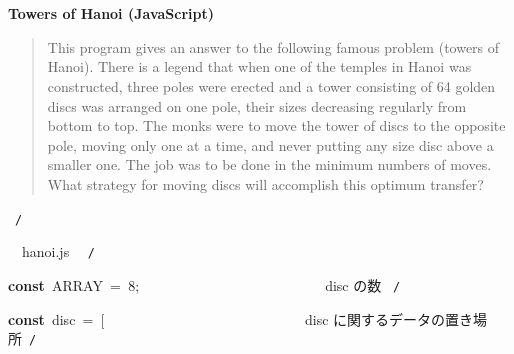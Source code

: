 \documentclass[a4paper,10pt]{article}
\def\mc{\relax}
\begin{document}
\tt\mc 

\noindent
\mbox{}\rm\mc {\tt /}{\tt *}\  \hrulefill *
\tt\mc 

\noindent
\mbox{}\hfill

\noindent
\mbox{}\rm\mc \ %

\centerline{\bf Towers of Hanoi (JavaScript)}

\begin{quote}

This program gives an answer to the following famous problem (towers of
Hanoi).
There is a legend that when one of the temples in Hanoi was constructed,
three poles were erected and a tower consisting of 64 golden discs was
arranged on one pole, their sizes decreasing regularly from bottom to top.
The monks were to move the tower of discs to the opposite pole, moving
only one at a time, and never putting any size disc above a smaller one.
The job was to be done in the minimum numbers of moves. What strategy for
moving discs will accomplish this optimum transfer?
\end{quote}

\tt\mc 

\noindent
\mbox{}\hfill

\noindent
\mbox{}\rm\mc {\tt *} \hrulefill \rm\mc \ {\tt *}{\tt /}
\tt\mc 

\noindent
\mbox{}\hfill

\noindent
\mbox{}\rm\mc {\tt /}{\tt *}\  \hrulefill\ hanoi.js \ \hrulefill \rm\mc \ {\tt *}{\tt /}
\tt\mc 

\noindent
\mbox{}\hfill

\noindent
\mbox{}\textbf{const}{\tt\mc \ }ARRAY{\tt\mc \ }={\tt\mc \ }8;{\tt\mc \ }{\tt\mc \ }{\tt\mc \ }{\tt\mc \ }{\tt\mc \ }{\tt\mc \ }{\tt\mc \ }{\tt\mc \ }{\tt\mc \ }{\tt\mc \ }{\tt\mc \ }{\tt\mc \ }{\tt\mc \ }{\tt\mc \ }{\tt\mc \ }{\tt\mc \ }{\tt\mc \ }{\tt\mc \ }{\tt\mc \ }{\tt\mc \ }{\tt\mc \ }{\tt\mc \ }{\tt\mc \ }{\tt\mc \ }\rm\mc {\tt /}{\tt *}\  \ disc の数 \hfill \rm\mc \ {\tt *}{\tt /}
\tt\mc 

\noindent
\mbox{}\hfill

\noindent
\mbox{}\textbf{const}{\tt\mc \ }disc{\tt\mc \ }={\tt\mc \ }[{\tt\mc \ }{\tt\mc \ }{\tt\mc \ }{\tt\mc \ }{\tt\mc \ }{\tt\mc \ }{\tt\mc \ }{\tt\mc \ }{\tt\mc \ }{\tt\mc \ }{\tt\mc \ }{\tt\mc \ }{\tt\mc \ }{\tt\mc \ }{\tt\mc \ }{\tt\mc \ }{\tt\mc \ }{\tt\mc \ }{\tt\mc \ }{\tt\mc \ }{\tt\mc \ }{\tt\mc \ }{\tt\mc \ }{\tt\mc \ }{\tt\mc \ }{\tt\mc \ }\rm\mc {\tt /}{\tt *}\  \ disc に関するデータの置き場所\hfill \rm\mc \ {\tt *}{\tt /}
\tt\mc 
\end{document}
